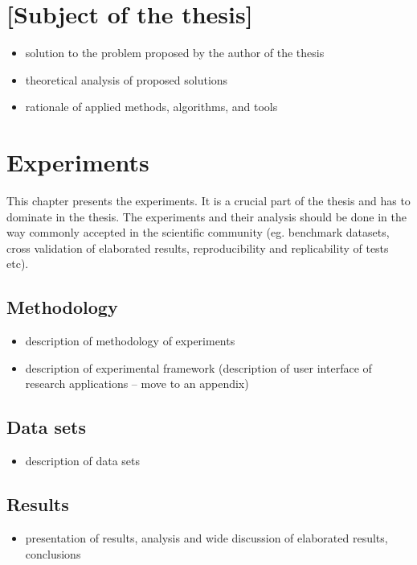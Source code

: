\documentclass[a4paper,twoside,12pt]{book}
\begin{document}
\chapter{[Subject of the thesis]}

\begin{itemize}
\item solution to the problem proposed by the author of the thesis
\item theoretical analysis of proposed solutions
\item rationale of applied methods, algorithms, and tools
\end{itemize}

\chapter{Experiments}

This chapter presents the experiments. It is a crucial part of the thesis and has to dominate in the thesis. 
The experiments and their analysis should be done in the way commonly accepted in the scientific community (eg. benchmark datasets, cross validation of elaborated results, reproducibility and replicability of tests etc).


\section{Methodology}

\begin{itemize}
\item description of methodology of experiments
\item description of experimental framework (description of user interface of research applications – move to an appendix)
\end{itemize}


\section{Data sets}

\begin{itemize}
\item description of data sets
\end{itemize}


\section{Results}

\begin{itemize}
\item presentation of results, analysis and wide discussion of elaborated results, conclusions
\end{itemize}
\end{document}
